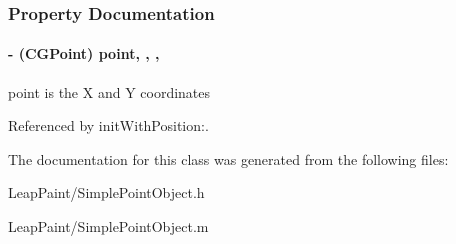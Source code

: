 \subsubsection{Property Documentation}
\hypertarget{interface_simple_point_object_a9796a8e6a00e61bb255f59a80aef77d4}{
\paragraph[{point}]{\setlength{\rightskip}{0pt plus 5cm}-\/ (C\-G\-Point) point\hspace{0.3cm}{\ttfamily [read]}, {\ttfamily [write]}, {\ttfamily [nonatomic]}, {\ttfamily [assign]}}}\label{d8/d8e/interface_simple_point_object_a9796a8e6a00e61bb255f59a80aef77d4}
point is the X and Y coordinates 

Referenced by init\-With\-Position\-:.



The documentation for this class was generated from the following files\-:\begin{DoxyCompactItemize}
\item 
Leap\-Paint/Simple\-Point\-Object.\-h\item 
Leap\-Paint/Simple\-Point\-Object.\-m\end{DoxyCompactItemize}
